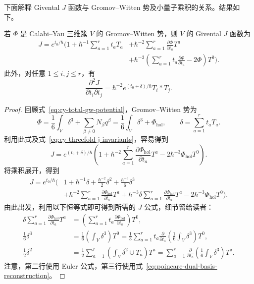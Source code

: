 下面解释 Givental $J$ 函数与 Gromov--Witten 势及小量子乘积的关系。结果如下。
\begin{proposition}\label{prop:cy-threefold-j-potential}
若 $\Phi$ 是 Calabi--Yau 三维簇 $V$ 的 Gromov--Witten 势，则 $V$ 的 Givental $J$ 函数为
\[
\begin{aligned}
J=e^{t_0/\hbar}\biggl(1+\hbar^{-1}\sum_{a=1}^rt_aT_a
&+\hbar^{-2}\sum_{a=1}^r\frac{\partial\Phi}{\partial t_a}T^a\\
&+\hbar^{-3}\left(\sum_{a=1}^rt_a\frac{\partial\Phi}{\partial t_a}-2\Phi\right)T^0\biggr).
\end{aligned}
\]
此外，对任意 $1\le i,j\le r$，有
\[
\frac{\partial^2J}{\partial t_i\partial t_j}
=\hbar^{-2}e^{(t_0+\delta)/\hbar}T_i*T_j.
\]
\end{proposition}
\begin{proof}
回顾式~\eqref{eq:cy-total-gw-potential}，Gromov--Witten 势为
\[
\Phi=\frac16\int_V\delta^3+\sum_{\beta\ne0}N_\beta q^\beta
=\frac16\int_V\delta^3+\Phi_{\mathrm{hol}},\qquad\delta=\sum_{a=1}^rt_aT_a.
\]
利用此式及式~\eqref{eq:cy-threefold-j-invariants}，容易得到
\[
J=e^{(t_0+\delta)/\hbar}\left(1+\hbar^{-2}\sum_{a=1}^r
\frac{\partial\Phi_{\mathrm{hol}}}{\partial t_a}T^a-2\hbar^{-3}\Phi_{\mathrm{hol}}T^0\right).
\]
将乘积展开，得到
\[
\begin{aligned}
J=e^{t_0/\hbar}\biggl(&1+\hbar^{-1}\delta
+\frac{\hbar^{-2}}2\delta^2+\frac{\hbar^{-3}}6\delta^3\\
&+\hbar^{-2}\sum_{a=1}^r\frac{\partial\Phi_{\mathrm{hol}}}{\partial t_a}T^a
+\hbar^{-3}\delta\sum_{a=1}^r\frac{\partial\Phi_{\mathrm{hol}}}{\partial t_a}T^a
-2\hbar^{-3}\Phi_{\mathrm{hol}}T^0\biggr).
\end{aligned}
\]
由此出发，利用以下恒等式即可得到所需的 $J$ 公式，细节留给读者：
\begin{equation}\label{eq:cy-threefold-potential-euler-identities}
\begin{aligned}
\delta\sum_{a=1}^r\frac{\partial\Phi_{\mathrm{hol}}}{\partial t_a}T^a
&=\left(\sum_{a=1}^rt_a\frac{\partial\Phi_{\mathrm{hol}}}{\partial t_a}\right)T^0,\\
\frac16\delta^3&=\frac16\left(\int_V\delta^3\right)T^0
=\frac13\sum_{a=1}^rt_a\frac\partial{\partial t_a}
\left(\frac16\int_V\delta^3\right)T^0,\\
\frac12\delta^2&=\frac12\sum_{a=1}^r\left(\int_V\delta^2\cup T_a\right)T^a
=\sum_{a=1}^r\frac\partial{\partial t_a}
\left(\frac16\int_V\delta^3\right)T^a.
\end{aligned}
\end{equation}
注意，第二行使用 Euler 公式，第三行使用式~\eqref{eq:poincare-dual-basis-reconstruction}。


\end{proof}
